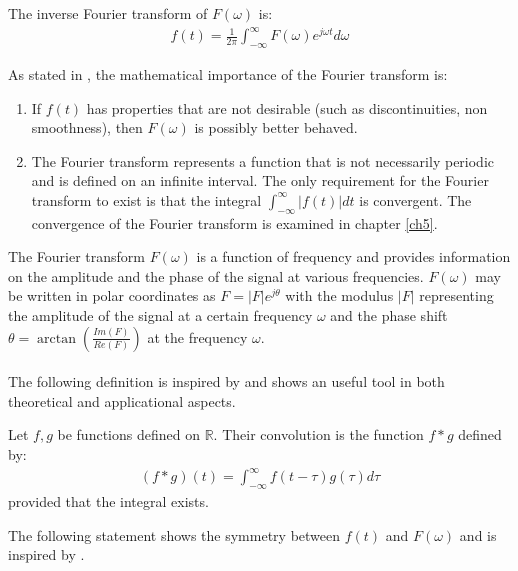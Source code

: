 \begin{definition} \label{def:InverseFourier_trans}
The inverse Fourier transform of $F(\omega)$ is:
\begin{align*}
f(t) = \frac{1}{2\pi} \int_{-\infty}^\infty F(\omega) e^{j \omega t} d\omega
\end{align*}
\end{definition}

\noindent
As stated in \cite{FourierTrans}, the mathematical importance of the Fourier transform is: 
\begin{enumerate}
\item If $f(t)$ has properties that are not desirable (such as discontinuities, non smoothness), then $F(\omega)$ is possibly better behaved.
\item The Fourier transform represents a function that is not necessarily periodic and is defined on an infinite interval. The only requirement for the Fourier transform to exist is that the integral $\int_{-\infty}^\infty |f(t)| dt$ is convergent. The convergence of the Fourier transform is examined in chapter \ref{ch5}.
\end{enumerate}

\noindent
The Fourier transform $F(\omega)$ is a function of frequency and provides information on the amplitude and the phase of the signal at various frequencies. $F(\omega)$ may be written in polar coordinates as $F = |F|e^{j\theta}$ with the modulus $|F|$ representing the amplitude of the signal at a certain frequency $\omega$ and the phase shift $\theta = \arctan \left(\frac{Im(F)}{Re(F)} \right)$ at the frequency $\omega$.
\\ \\
The following definition is inspired by \cite{page 206, FAA} and shows an useful tool in both theoretical and applicational aspects.
\begin{definition} \label{def:Convol}
Let $f,g$ be functions defined on $\mathbb{R}$. Their convolution is the function $f*g$ defined by:
\begin{align*}
(f*g)(t) = \int_{-\infty}^\infty f(t-\tau) g(\tau) d\tau
\end{align*}
provided that the integral exists.
\end{definition}

\noindent
The following statement shows the symmetry between $f(t)$ and $F(\omega)$ and is inspired by \cite{page 214, FAA}.

